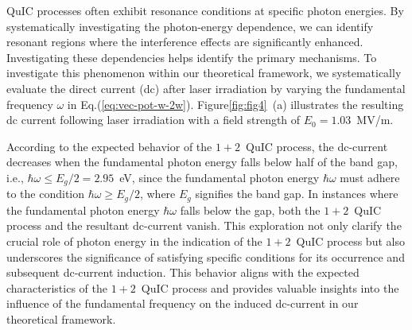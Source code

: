 \gls{QuIC} processes often exhibit resonance conditions at specific photon energies. By systematically investigating the photon-energy dependence, we can identify resonant regions where the interference effects are significantly enhanced.  Investigating these dependencies helps identify the primary mechanisms. To investigate this phenomenon within our theoretical framework, we systematically evaluate the direct current (dc) after laser irradiation by varying the fundamental frequency $\omega$ in Eq.(\ref{eq:vec-pot-w-2w}). Figure\ref{fig:fig4}~(a) illustrates the resulting dc current following laser irradiation with a field strength of $E_0=1.03$~MV/m. 

According to the expected behavior of the $1+2$~\gls{QuIC} process, the dc-current decreases when the fundamental photon energy falls below half of the band gap, i.e., $\hbar \omega \le E_g/2 = 2.95$~eV,  since the fundamental photon energy $\hbar \omega$ must adhere to the condition $\hbar \omega \ge E_g/2$, where $E_g$ signifies the band gap. 
In instances where the fundamental photon energy $\hbar \omega$ falls below the gap, both the $1+2$~QuIC process and the resultant dc-current vanish. This exploration not only clarify the crucial role of photon energy in the indication of the $1+2$~\gls{QuIC} process but also underscores the significance of satisfying specific conditions for its occurrence and subsequent dc-current induction.
This behavior aligns with the expected characteristics of the $1+2$~\gls{QuIC} process and provides valuable insights into the influence of the fundamental frequency on the induced dc-current in our theoretical framework.
